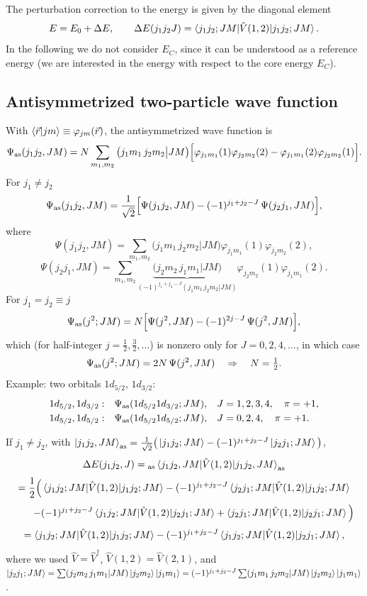 \documentclass[11pt,a4paper]{article}
\newcommand{\op}[1]{\hat{#1}}
\begin{document}
The perturbation correction to the energy is given by the diagonal element
\[
E=E_0+\Delta E,\qquad \Delta E(j_1j_2J)=\braket{j_1j_2;JM|\op V(1,2)|j_1j_2;JM}.
\]
In the following we do not consider $E_C$, since it can be understood as a reference energy (we are interested in the energy with respect to the core energy $E_C$).

\subsection{Antisymmetrized two-particle wave function}
With $\braket{\vec r|jm}\equiv\varphi_{jm}(\vec r)$, the antisymmetrized wave function is
\[
\Psi_{\rm as}(j_1j_2,JM)=N\sum_{m_1,m_2}\big(j_1m_1\,j_2m_2\big|JM\big)\Big[\varphi_{j_1m_1}(1)\varphi_{j_2m_2}(2)-\varphi_{j_1m_1}(2)\varphi_{j_2m_2}(1)\Big].
\]
For $j_1\neq j_2$
\[
\Psi_{\rm as}(j_1j_2,JM)=\frac{1}{\sqrt2}\Big[\Psi(j_1j_2,JM)-(-1)^{j_1+j_2-J}\,\Psi(j_2j_1,JM)\Big],
\]
where
\[
\Psi(j_1j_2,JM)=\sum_{m_1,m_2}\big(j_1m_1\,j_2m_2\big|JM\big)\varphi_{j_1m_1}(1)\varphi_{j_2m_2}(2),
\]
\[
\Psi(j_2j_1,JM)=\sum_{m_1,m_2}\underbrace{\big(j_2m_2\,j_1m_1\big|JM\big)}_{(-1)^{j_1+j_2-J}(j_1m_1\,j_2m_2|JM)}\varphi_{j_2m_2}(1)\varphi_{j_1m_1}(2).
\]
For $j_1=j_2\equiv j$
\[
\Psi_{\rm as}(j^2;JM)=N\Big[\Psi(j^2,JM)-(-1)^{2j-J}\,\Psi(j^2,JM)\Big],
\]
which (for half-integer $j=\frac12,\frac32,\dots$) is nonzero only for $J=0,2,4,\dots$, in which case
\[
\Psi_{\rm as}(j^2;JM)=2N\,\Psi(j^2,JM)\quad\Rightarrow\quad N=\tfrac12 .
\]
Example: two orbitals $1d_{5/2}$, $1d_{3/2}$:
\[
\begin{array}{lll}
1d_{5/2},1d_{3/2}: & \Psi_{\rm as}(1d_{5/2}1d_{3/2};JM), & J=1,2,3,4,\quad \pi=+1,\\[1mm]
1d_{5/2},1d_{5/2}: & \Psi_{\rm as}(1d_{5/2}1d_{5/2};JM), & J=0,2,4,\quad \pi=+1.
\end{array}
\]

If $j_1\ne j_2$, with $\ket{j_1j_2,JM}_{\rm as}=\frac{1}{\sqrt2}\big(\ket{j_1j_2;JM}-(-1)^{j_1+j_2-J}\ket{j_2j_1;JM}\big)$,
\[
\Delta E(j_1j_2,J)={}_{\rm as}\braket{j_1j_2,JM|\op V(1,2)|j_1j_2,JM}_{\rm as}
\]
\[
=\frac12\Big(\braket{j_1j_2;JM|\op V(1,2)|j_1j_2;JM}-(-1)^{j_1+j_2-J}\braket{j_2j_1;JM|\op V(1,2)|j_1j_2;JM}
\]
\[
\qquad-(-1)^{j_1+j_2-J}\braket{j_1j_2;JM|\op V(1,2)|j_2j_1;JM}+\braket{j_2j_1;JM|\op V(1,2)|j_2j_1;JM}\Big)
\]
\[
=\braket{j_1j_2;JM|\op V(1,2)|j_1j_2;JM}-(-1)^{j_1+j_2-J}\braket{j_1j_2;JM|\op V(1,2)|j_2j_1;JM},
\]
where we used $\op V=\op V^\dagger$, $\op V(1,2)=\op V(2,1)$, and
$\ket{j_2j_1;JM}=\sum(j_2m_2\,j_1m_1|JM)\ket{j_2m_2}\ket{j_1m_1}=(-1)^{j_1+j_2-J}\sum(j_1m_1\,j_2m_2|JM)\ket{j_2m_2}\ket{j_1m_1}$.
\end{document}
